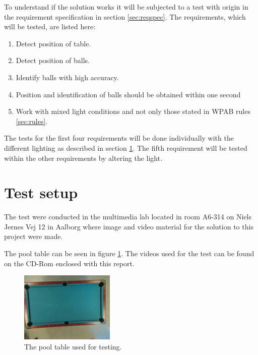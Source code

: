 To understand if the solution works it will be subjected to a test with origin in the requirement specification in section \ref{sec:reqspec}. The requirements, which will be tested, are listed here:

\begin{enumerate}
\setlength{\itemsep}{0mm}
	\item Detect position of table.
	\item Detect position of balls.
	\item Identify balls with high accuracy.
	\item Position and identification of balls should be obtained within one second
	\item Work with mixed light conditions and not only those stated in WPAB rules \ref{sec:rules}.
\end{enumerate}

The tests for the first four requirements will be done individually with the different lighting as described in section \ref{sec:testsetup}. The fifth requirement will be tested within the other requirements by altering the light.

\section{Test setup}
\label{sec:testsetup}
The test were conducted in the multimedia lab located in room A6-314 on Niels Jernes Vej 12 in Aalborg where image and video material for the solution to this project were made. 

The pool table can be seen in figure \ref{fig:pooltableimg}. The videos used for the test can be found on the CD-Rom enclosed with this report.

\begin{figure}[H]
\begin{center}
\leavevmode
\includegraphics[width=0.4\textwidth]{images/test/light/input}
\end{center}
   \caption{The pool table used for testing.}
  \label{fig:pooltableimg}
\end{figure} 

